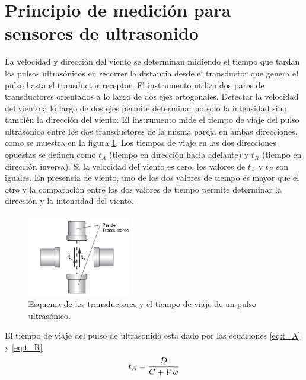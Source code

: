 \section{Principio de medición para sensores de ultrasonido}\label{ap:principioDeMedicionUltrasonido}

La velocidad y dirección del viento se determinan midiendo el tiempo que tardan los pulsos ultrasónicos en recorrer la distancia desde el transductor que genera el pulso hasta el transductor receptor. El instrumento utiliza dos pares de transductores orientados a lo largo de dos ejes ortogonales. Detectar la velocidad del viento a lo largo de dos ejes permite determinar no solo la intensidad sino también la dirección del viento. El instrumento mide el tiempo de viaje del pulso ultrasónico entre los dos transductores de la misma pareja en ambas direcciones, como se muestra en la figura \ref{fig:trasductoresUltra}. Los tiempos de viaje en las dos direcciones opuestas se definen como $t_{A}$ (tiempo en dirección hacia adelante) y $t_{R}$ (tiempo en dirección inversa). Si la velocidad del viento es cero, los valores de $t_{A}$ y $t_{R}$ son iguales. En presencia de viento, uno de los dos valores de tiempo es mayor que el otro y la comparación entre los dos valores de tiempo permite determinar la dirección y la intensidad del viento.

\begin{figure}[H]
  \centering
  \includegraphics[width=0.4\textwidth]{Figuras/apendiceA/trasductoresUltra.png}
  \caption{Esquema de los transductores y el tiempo de viaje de un pulso ultrasónico. \cite{DeltaOHM_HD51.3D_manual}}
  \label{fig:trasductoresUltra}
\end{figure}

El tiempo de viaje del pulso de ultrasonido esta dado por las ecuaciones \ref{eq:t_A} y \ref{eq:t_R}
\begin{equation}
  t_{A} = \frac{D}{C + Vw}
  \centering
  \label{eq:t_A}
\end{equation}

